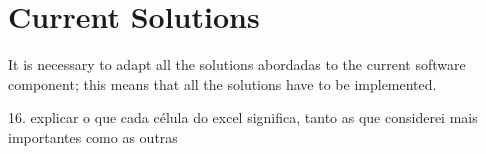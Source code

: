 





\section{Current Solutions}\label{sec:II_curr_solutions}
It is necessary to adapt all the solutions abordadas to the current software component; this means that all the solutions have to be implemented.

16. explicar o que cada célula do excel significa, tanto as que considerei mais importantes como as outras

